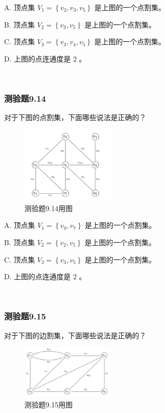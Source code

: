 \documentclass[UTF8, heading=true]{ctexart}
\begin{document}
A. 顶点集 $V_1=\left\{v_2, v_3, v_5\right\}$ 是上图的一个点割集。

B. 顶点集 $V_2=\left\{v_3, v_5\right\}$ 是上图的一个点割集。

C. 顶点集 $V_3=\left\{v_3, v_4, v_5\right\}$ 是上图的一个点割集。

D.  上图的点连通度是 2 。

\textcolor{white}{答案：D}

\subsubsection{测验题9.14}

对于下图的点割集，下面哪些说法是正确的？

\begin{figure}[H]
    \centering
    \includegraphics[width=0.4\textwidth]{9.14.jpg} %
    \caption{测验题9.14用图}
\end{figure}

A. 顶点集 $V_1=\left\{v_0, v_7\right\}$ 是上图的一个点割集。

B. 顶点集 $V_2=\left\{v_2, v_5\right\}$ 是上图的一个点割集。

C. 顶点集 $V_3=\left\{v_3, v_5\right\}$ 是上图的一个点割集。

D.  上图的点连通度是 2 。

\textcolor{white}{答案：AC}

\subsubsection{测验题9.15}

对于下图的边割集，下面哪些说法是正确的？

\begin{figure}[H]
    \centering
    \includegraphics[width=0.4\textwidth]{9.15.jpg} %
    \caption{测验题9.15用图}
\end{figure}
\end{document}

